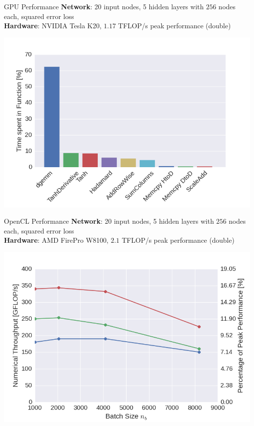 \documentclass{beamer}
\begin{document}
\begin{frame}{GPU Performance}
  \textbf{Network}: 20 input nodes, 5 hidden layers with $256$ nodes each,
  squared error loss \\
  \textbf{Hardware}: NVIDIA Tesla K20, $1.17$ TFLOP/s peak performance (double)
  \begin{center}
  \includegraphics[width=0.8\linewidth]{prof_gpu}
  \end{center}
\end{frame}

\begin{frame}{OpenCL Performance}
  \textbf{Network}: 20 input nodes, 5 hidden layers with $256$ nodes each,
  squared error loss \\
  \textbf{Hardware}: AMD FirePro W8100, $2.1$ TFLOP/s peak performance (double)
  \begin{center}
  \includegraphics[width=0.8\linewidth]{perf_opencl}
  \end{center}
\end{frame}
\end{document}

